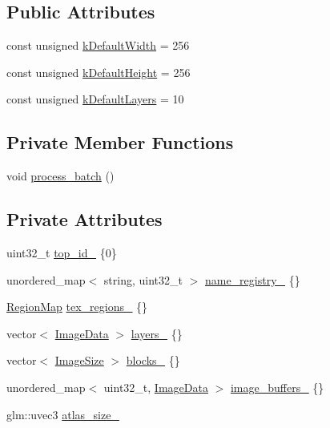 \subsection*{Public Attributes}
\begin{DoxyCompactItemize}
\item 
const unsigned \hyperlink{classpixel_1_1graphics_1_1_texture_atlas_a0cff96af3a64403a814ef3f71553f56c}{k\+Default\+Width} = 256
\item 
const unsigned \hyperlink{classpixel_1_1graphics_1_1_texture_atlas_a7ba581f764c5834461065bd12c7a7896}{k\+Default\+Height} = 256
\item 
const unsigned \hyperlink{classpixel_1_1graphics_1_1_texture_atlas_a417a154d70b9f8aa6120663efefa1533}{k\+Default\+Layers} = 10
\end{DoxyCompactItemize}
\subsection*{Private Member Functions}
\begin{DoxyCompactItemize}
\item 
void \hyperlink{classpixel_1_1graphics_1_1_texture_atlas_ae727e06190ac2ea1825d1730ffcdefde}{process\+\_\+batch} ()
\end{DoxyCompactItemize}
\subsection*{Private Attributes}
\begin{DoxyCompactItemize}
\item 
uint32\+\_\+t \hyperlink{classpixel_1_1graphics_1_1_texture_atlas_a937b633955dce94fc601fafa2ae072f6}{top\+\_\+id\+\_\+} \{0\}
\item 
unordered\+\_\+map$<$ string, uint32\+\_\+t $>$ \hyperlink{classpixel_1_1graphics_1_1_texture_atlas_a82e904e220f5a0279f1bb52035eb3157}{name\+\_\+registry\+\_\+} \{\}
\item 
\hyperlink{classpixel_1_1graphics_1_1_texture_atlas_adcb359d1961bd99f8eeb35f456df1e0c}{Region\+Map} \hyperlink{classpixel_1_1graphics_1_1_texture_atlas_ae3b2220f2c72691db3f01b13bb461d63}{tex\+\_\+regions\+\_\+} \{\}
\item 
vector$<$ \hyperlink{structpixel_1_1graphics_1_1_image_data}{Image\+Data} $>$ \hyperlink{classpixel_1_1graphics_1_1_texture_atlas_a3bd29372dd04c522a4cde4227d577946}{layers\+\_\+} \{\}
\item 
vector$<$ \hyperlink{structpixel_1_1graphics_1_1_texture_atlas_1_1_image_size}{Image\+Size} $>$ \hyperlink{classpixel_1_1graphics_1_1_texture_atlas_aea73fa43e6505c3f85afeb1566f4aa21}{blocks\+\_\+} \{\}
\item 
unordered\+\_\+map$<$ uint32\+\_\+t, \hyperlink{structpixel_1_1graphics_1_1_image_data}{Image\+Data} $>$ \hyperlink{classpixel_1_1graphics_1_1_texture_atlas_a0e583dd99d8082e536eee49bcdc4216c}{image\+\_\+buffers\+\_\+} \{\}
\item 
glm\+::uvec3 \hyperlink{classpixel_1_1graphics_1_1_texture_atlas_a80526484f92293415e18f8bad05b7de4}{atlas\+\_\+size\+\_\+}
\end{DoxyCompactItemize}


